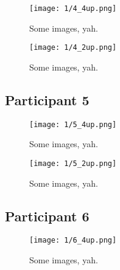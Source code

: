 \begin{figure}[h]
	\begin{center}
	\texttt{[image: 1/4\_4up.png]}
	\caption{Some images, yah.}
	\end{center}
\end{figure}

\clearpage

\begin{figure}[h]
	\begin{center}
	\texttt{[image: 1/4\_2up.png]}
	\caption{Some images, yah.}
	\end{center}
\end{figure}


\subsection{Participant 5}

\clearpage

\begin{figure}[h]
	\begin{center}
	\texttt{[image: 1/5\_4up.png]}
	\caption{Some images, yah.}
	\end{center}
\end{figure}

\clearpage

\begin{figure}[h]
	\begin{center}
	\texttt{[image: 1/5\_2up.png]}
	\caption{Some images, yah.}
	\end{center}
\end{figure}


\subsection{Participant 6}

\clearpage

\begin{figure}[h]
	\begin{center}
	\texttt{[image: 1/6\_4up.png]}
	\caption{Some images, yah.}
	\end{center}
\end{figure}

